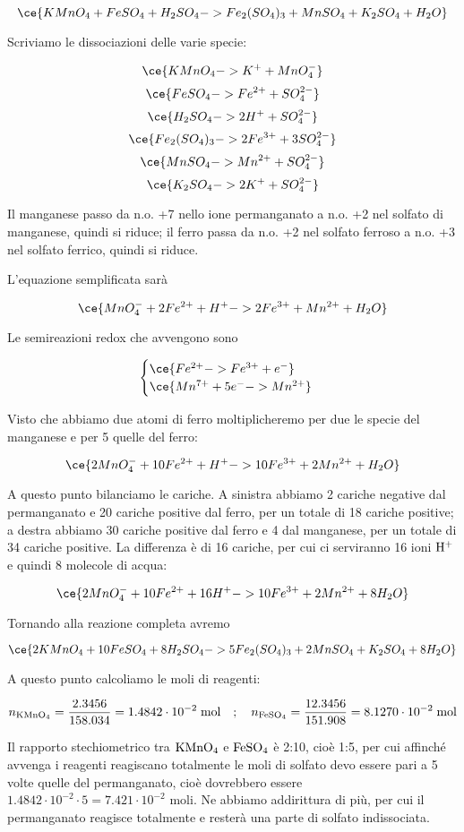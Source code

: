 $$\ce{KMnO_4 + FeSO_4 + H_2SO_4 -> Fe_2(SO_4)_3 + MnSO_4 + K_2SO_4 + H_2O}$$

Scriviamo le dissociazioni delle varie specie:

$$\ce{KMnO_4 -> K^+ + MnO_4^-}$$
$$\ce{FeSO_4 -> Fe^{2+} + SO_4^{2-}}$$
$$\ce{H_2SO_4 -> 2H^+ + SO_4^{2-}}$$
$$\ce{Fe_2(SO_4)_3 -> 2Fe^{3+} + 3SO_4^{2-}}$$
$$\ce{MnSO_4 -> Mn^{2+} + SO_4^{2-}}$$
$$\ce{K_2SO_4 -> 2K^+ + SO_4^{2-}}$$

Il manganese passo da n.o. +7 nello ione permanganato a n.o. +2 nel solfato di manganese, quindi si riduce; il ferro passa da n.o. +2 nel solfato ferroso a n.o. +3 nel solfato ferrico, quindi si riduce.

L'equazione semplificata sarà

$$\ce{MnO_4^- + 2Fe^{2+} + H^+ -> 2Fe^{3+} + Mn^{2+} + H_2O}$$

Le semireazioni redox che avvengono sono

$$\begin{cases}
    \ce{Fe^{2+} -> Fe^{3+} + e^-}\\
    \ce{Mn^{7+} + 5e^- -> Mn^{2+}}
\end{cases}$$

Visto che abbiamo due atomi di ferro moltiplicheremo per due le specie del manganese e per 5 quelle del ferro:

$$\ce{2MnO_4^- + 10Fe^{2+} + H^+ -> 10Fe^{3+} + 2Mn^{2+} + H_2O}$$

A questo punto bilanciamo le cariche. A sinistra abbiamo 2 cariche negative dal permanganato e 20 cariche positive dal ferro, per un totale di 18 cariche positive; a destra abbiamo 30 cariche positive dal ferro e 4 dal manganese, per un totale di 34 cariche positive. La differenza è di 16 cariche, per cui ci serviranno 16 ioni $\rm H^+$ e quindi 8 molecole di acqua:

$$\ce{2MnO_4^- + 10Fe^{2+} + 16H^+ -> 10Fe^{3+} + 2Mn^{2+} + 8H_2O}$$

Tornando alla reazione completa avremo

$$\ce{2KMnO_4 + 10FeSO_4 + 8H_2SO_4 -> 5Fe_2(SO_4)_3 + 2MnSO_4 + K_2SO_4 + 8H_2O}$$

A questo punto calcoliamo le moli di reagenti:

$$n_{\rm KMnO_4}=\frac{2.3456}{158.034}
=1.4842 \cdot 10^{-2} \; \text{mol}
\quad;\quad
n_{\rm FeSO_4}=\frac{12.3456}{151.908}
=8.1270 \cdot 10^{-2} \; \rm mol$$

Il rapporto stechiometrico tra $\rm KMnO_4$ e $\rm FeSO_4$ è 2:10, cioè 1:5, per cui affinché avvenga i reagenti reagiscano totalmente le moli di solfato devo essere pari a 5 volte quelle del permanganato, cioè dovrebbero essere $1.4842 \cdot 10^{-2} \cdot 5=7.421 \cdot 10^{-2}$ moli. Ne abbiamo addirittura di più, per cui il permanganato reagisce totalmente e resterà una parte di solfato indissociata.

